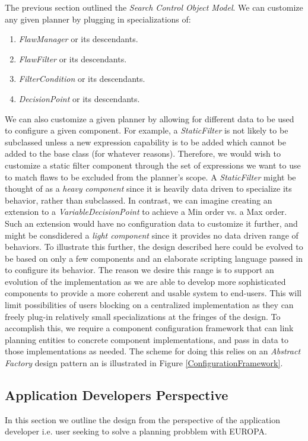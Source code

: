 \documentclass[10pt, letterpaper, oneside]{article}
\begin{document}
The previous section outlined the {\em Search Control Object Model}. We can customize any given planner by plugging in specializations of:
\begin{enumerate}
\item {\em FlawManager} or its descendants.
\item {\em FlawFilter} or its descendants.
\item {\em FilterCondition} or its descendants.
\item {\em DecisionPoint} or its descendants.
\end{enumerate}
We can also customize a given planner by allowing for different data to be used to configure a given component. For example, a {\em StaticFilter} is not likely to be subclassed unless a new expression capability is to be added which cannot be added to the base class (for whatever reasons). Therefore, we would wish to customize a static filter component through the set of expressions we want to use to match flaws to be excluded from the planner's scope. A {\em StaticFilter} might be thought of as a {\em heavy component} since it is heavily data driven to specialize its behavior, rather than subclassed. In contrast, we can imagine creating an extension to a {\em VariableDecisionPoint} to achieve a Min order vs. a Max order. Such an extension would have no configuration data to customize it further, and might be consdidered a {\em light component} since it provides no data driven range of behaviors. To illustrate this further, the design described here could be evolved to be based on only a few components and an elaborate scripting language passed in to configure its behavior. The reason we desire this range is to support an evolution of the implementation as we are able to develop more sophisticated components to provide a more coherent and usable system to end-users. This will limit possibilities of users blocking on a centralized implementation as they can freely plug-in relatively small specializations at the fringes of the design. To accomplish this, we require a component configuration framework that can link planning entities to concrete component implementations, and pass in data to those implementations as needed. The scheme for doing this relies on an {\em Abstract Factory} design pattern an is illustrated in Figure \ref{ConfigurationFramework}.

\subsection{Application Developers Perspective}
In this section we outline the design from the perspective of the application developer i.e. user seeking to solve a planning probblem with EUROPA.
\end{document}
